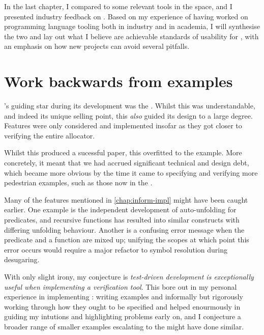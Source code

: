 In the last chapter, I compared  to some relevant tools in the
space, and I presented industry feedback on .
Based on my experience of having worked on programming language tooling both in
industry and in academia, I will synthesise the two and lay out what I believe
are achievable standards of usability for , with an emphasis on how new
projects can avoid several pitfalls.

\section{Work backwards from examples}

's guiding star during its development was the .
Whilst this was understandable, and indeed its unique selling point, this
\emph{also} guided its design to a large degree. Features were only considered
and implemented insofar as they got  closer to verifying the entire
allocator.

Whilst this produced a sucessful paper, this overfitted  to the example.
More concretely, it meant that we had accrued significant technical and design
debt, which became more obvious by the time it came to specifying and verifying
more pedestrian examples, such as those now in the .

Many of the features mentioned in \cref{chap:inform-impl} might have been
caught earlier. One example is the independent development of auto-unfolding
for predicates, and recursive functions has resulted into similar constructs
with differing unfolding
behaviour. Another is a confusing error message when the predicate and a function
are mixed up; unifying the scopes at which point this error occurs would
require a major refactor to symbol resolution during
desugaring.

With only slight irony, my conjecture is \emph{test-driven development is
exceptionally useful when implementing a verification tool}. This bore out in
my personal experience in implementing : writing examples and
informally but rigorously working through how they ought to be specified and
helped enourmously in guiding my intutions and highlighting problems early on,
and I conjecture a broader range of smaller examples escalating to the
 might have done similar.

